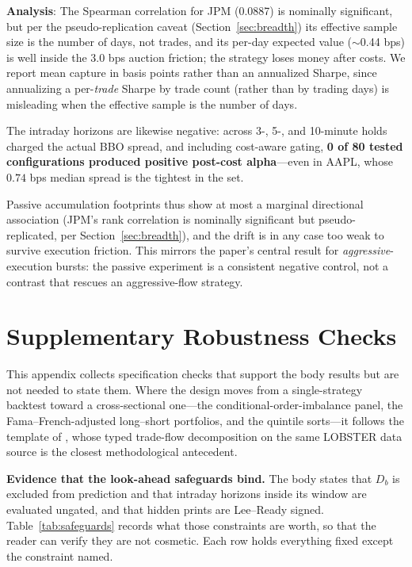 \documentclass[11pt]{article}
\begin{document}
\textbf{Analysis}: The Spearman correlation for JPM (0.0887) is nominally significant, but per the pseudo-replication caveat (Section~\ref{sec:breadth}) its effective sample size is the number of days, not trades, and its per-day expected value ($\sim$0.44 bps) is well inside the 3.0 bps auction friction; the strategy loses money after costs. We report mean capture in basis points rather than an annualized Sharpe, since annualizing a per-\emph{trade} Sharpe by trade count (rather than by trading days) is misleading when the effective sample is the number of days.

The intraday horizons are likewise negative: across 3-, 5-, and 10-minute holds charged the actual BBO spread, and including cost-aware gating, \textbf{0 of 80 tested configurations produced positive post-cost alpha}---even in AAPL, whose $0.74$ bps median spread is the tightest in the set.

Passive accumulation footprints thus show at most a marginal directional association (JPM's rank correlation is nominally significant but pseudo-replicated, per Section~\ref{sec:breadth}), and the drift is in any case too weak to survive execution friction. This mirrors the paper's central result for \emph{aggressive}-execution bursts: the passive experiment is a consistent negative control, not a contrast that rescues an aggressive-flow strategy.

\section{Supplementary Robustness Checks}
\label{sec:audit}
This appendix collects specification checks that support the body results but are not needed to state them. Where the design moves from a single-strategy backtest toward a cross-sectional one---the conditional-order-imbalance panel, the Fama--French-adjusted long--short portfolios, and the quintile sorts---it follows the template of \citet{lrc2024}, whose typed trade-flow decomposition on the same LOBSTER data source is the closest methodological antecedent.

\textbf{Evidence that the look-ahead safeguards bind.} The body states that $D_b$ is excluded from prediction and that intraday horizons inside its window are evaluated ungated, and that hidden prints are Lee--Ready signed. Table~\ref{tab:safeguards} records what those constraints are worth, so that the reader can verify they are not cosmetic. Each row holds everything fixed except the constraint named.
\end{document}
